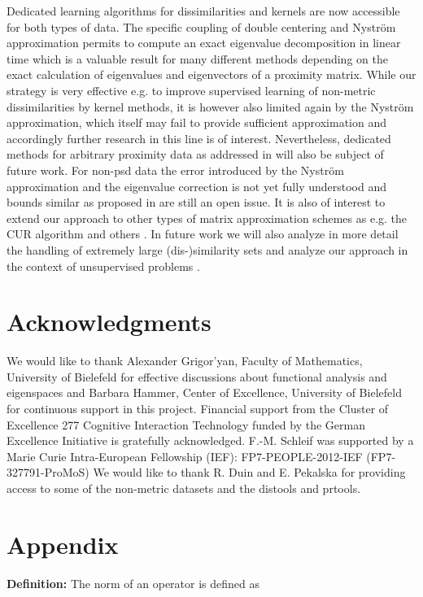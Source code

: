 \documentclass[twoside,11pt]{article}
\begin{document}
Dedicated learning algorithms for dissimilarities and kernels are now accessible for both types of data. 
The specific coupling of double centering and Nystr\"om approximation permits to compute
an exact eigenvalue decomposition in linear time which is a valuable result for many different methods
depending on the exact calculation of eigenvalues and eigenvectors of a proximity matrix. 
While our strategy is very effective e.g. to improve supervised learning of non-metric dissimilarities by kernel methods,
it is however also limited again by the Nystr\"om approximation, which itself may fail to provide sufficient approximation
and accordingly further research in this line is of interest. Nevertheless, dedicated methods for arbitrary proximity data 
as addressed in  \cite{DBLP:conf/sspr/PekalskaDGB04} will also be subject of future work. For non-psd data the error introduced by the Nystr\"om approximation and the eigenvalue correction 
is not yet fully understood and bounds similar as proposed in \cite{DBLP:journals/jmlr/DrineasM05}
are still an open issue. It is also of interest to extend our approach to other types of matrix approximation schemes
as e.g. the CUR algorithm and others \cite{wang2013improving,DBLP:conf/aistats/WangZ14,DBLP:conf/kdd/WangZQZ14}. In future work we will also analyze in more detail the handling of extremely large (dis-)similarity sets 
\cite{Schleif2014e,DBLP:conf/icml/GittensM13} and analyze our approach in the context of unsupervised problems \cite{DBLP:conf/icml/ZhangTK08}.

\section*{Acknowledgments}
We would like to thank Alexander Grigor'yan,  Faculty of Mathematics, 
University of Bielefeld for effective discussions about functional analysis and eigenspaces
and Barbara Hammer, Center of Excellence, University of Bielefeld for continuous support in this project.
Financial support from the Cluster of Excellence 277 Cognitive Interaction Technology 
funded by the German Excellence Initiative is gratefully acknowledged.  F.-M. Schleif was supported by a Marie Curie Intra-European Fellowship (IEF): FP7-PEOPLE-2012-IEF (FP7-327791-ProMoS) 
We would like to thank R. Duin and E. Pekalska for providing access to some of the non-metric datasets and the distools and prtools.

\section{Appendix}
\textbf{Definition:}
The norm of an operator  is defined as
\end{document}
